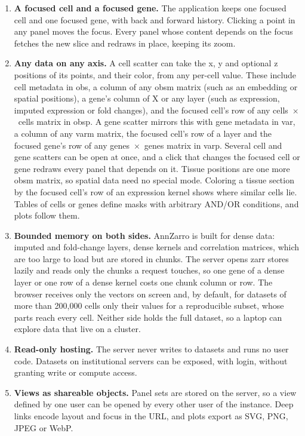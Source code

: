 \begin{enumerate}
\def\labelenumi{\arabic{enumi}.}
\tightlist
\item
  \textbf{A focused cell and a focused gene.} The application keeps one focused cell and one focused gene, with back and forward history. Clicking a point in any panel moves the focus. Every panel whose content depends on the focus fetches the new slice and redraws in place, keeping its zoom.
\item
  \textbf{Any data on any axis.} A cell scatter can take the x, y and optional z positions of its points, and their color, from any per-cell value. These include cell metadata in obs, a column of any obsm matrix (such as an embedding or spatial positions), a gene's column of X or any layer (such as expression, imputed expression or fold changes), and the focused cell's row of any cells~$\times$~cells matrix in obsp. A gene scatter mirrors this with gene metadata in var, a column of any varm matrix, the focused cell's row of a layer and the focused gene's row of any genes~$\times$~genes matrix in varp. Several cell and gene scatters can be open at once, and a click that changes the focused cell or gene redraws every panel that depends on it. Tissue positions are one more obsm matrix, so spatial data need no special mode. Coloring a tissue section by the focused cell's row of an expression kernel shows where similar cells lie. Tables of cells or genes define masks with arbitrary AND/OR conditions, and plots follow them.
\item
  \textbf{Bounded memory on both sides.} AnnZarro is built for dense data: imputed and fold-change layers, dense kernels and correlation matrices, which are too large to load but are stored in chunks. The server opens zarr stores lazily and reads only the chunks a request touches, so one gene of a dense layer or one row of a dense kernel costs one chunk column or row. The browser receives only the vectors on screen and, by default, for datasets of more than 200,000 cells only their values for a reproducible subset, whose parts reach every cell. Neither side holds the full dataset, so a laptop can explore data that live on a cluster.
\item
  \textbf{Read-only hosting.} The server never writes to datasets and runs no user code. 
Datasets on institutional servers can be exposed, with login, without granting write or compute access.
\item
  \textbf{Views as shareable objects.} Panel sets are stored on the server, so a view defined by one user can be opened by every other user of the instance. Deep links encode layout and focus in the URL, and plots export as SVG, PNG, JPEG or WebP.
\end{enumerate}

